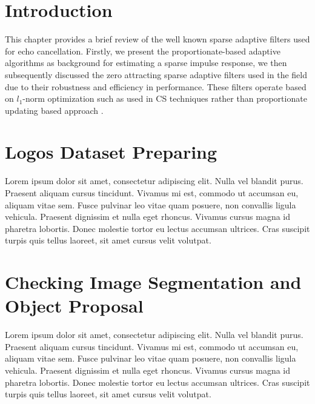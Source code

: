 \section{Introduction}\label{sec:5.1}
\vspace{-0.5cm}
\noindent This chapter provides a brief review of the well known sparse adaptive filters used for echo cancellation. Firstly, we present the proportionate-based adaptive algorithms as background for estimating a sparse impulse response, we then subsequently discussed the zero attracting sparse adaptive filters used in the field due to their robustness and efficiency in performance. These filters operate based on $l_1$-norm optimization such as used in CS techniques \cite{Dohono} rather than proportionate updating based approach \cite{Duttweiler}.

\vspace{-0.3cm}

\section{Logos Dataset Preparing}\label{sec:5.2}
\vspace{-0.5cm}
\noindent Lorem ipsum dolor sit amet, consectetur adipiscing elit. Nulla vel blandit purus. Praesent aliquam cursus tincidunt. Vivamus mi est, commodo ut accumsan eu, aliquam vitae sem. Fusce pulvinar leo vitae quam posuere, non convallis ligula vehicula. Praesent dignissim et nulla eget rhoncus. Vivamus cursus magna id pharetra lobortis. Donec molestie tortor eu lectus accumsan ultrices. Cras suscipit turpis quis tellus laoreet, sit amet cursus velit volutpat.

\vspace{-0.3cm}

\section{Checking Image Segmentation and Object Proposal}\label{sec:5.3}
\vspace{-0.5cm}
\noindent Lorem ipsum dolor sit amet, consectetur adipiscing elit. Nulla vel blandit purus. Praesent aliquam cursus tincidunt. Vivamus mi est, commodo ut accumsan eu, aliquam vitae sem. Fusce pulvinar leo vitae quam posuere, non convallis ligula vehicula. Praesent dignissim et nulla eget rhoncus. Vivamus cursus magna id pharetra lobortis. Donec molestie tortor eu lectus accumsan ultrices. Cras suscipit turpis quis tellus laoreet, sit amet cursus velit volutpat.


